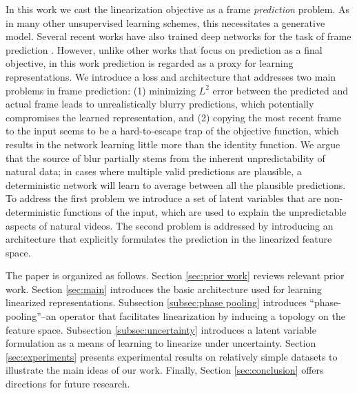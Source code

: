 In this work we cast the linearization objective as a frame \emph{prediction} problem. As in many other unsupervised learning schemes, this necessitates a generative model. Several recent works have also trained deep networks for the task of frame prediction \cite{FBvideo}\cite{supFromTracker}\cite{predAlexNet}. However, unlike other works that focus on prediction as a final objective, in this work prediction is regarded as a proxy for learning representations. We introduce a loss and architecture that addresses two main problems in frame prediction: (1) minimizing $L^2$ error between the predicted and actual frame leads to unrealistically blurry predictions, which potentially compromises the learned representation, and (2) copying the most recent frame to the input seems to be a hard-to-escape trap of the objective function,  which results in the network learning little more than the identity function. We argue that the source of blur partially stems from the inherent unpredictability of natural data; in cases where multiple valid predictions are plausible, a deterministic network will learn to average between all the plausible predictions. To address the first problem we introduce a set of latent variables that are non-deterministic functions of the input, which are used to explain the unpredictable aspects of natural videos. The second problem is addressed by introducing an architecture that explicitly formulates the prediction in the linearized feature space. 

The paper is organized as follows. Section \ref{sec:prior work} reviews relevant prior work. Section \ref{sec:main} introduces the basic architecture used for learning linearized representations.  Subsection \ref{subsec:phase pooling} introduces ``phase-pooling''--an operator that facilitates linearization by inducing a topology on the feature space. Subsection \ref{subsec:uncertainty} introduces a latent variable formulation as a means of learning to linearize under uncertainty. Section \ref{sec:experiments} presents experimental results on relatively simple datasets to illustrate the main ideas of our work. Finally, Section \ref{sec:conclusion} offers directions for future research. 
      
